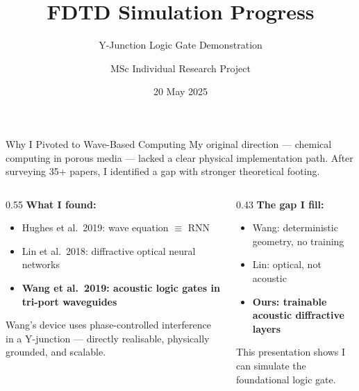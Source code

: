 \documentclass[aspectratio=169,11pt]{beamer}
\title{FDTD Simulation Progress}
\subtitle{Y-Junction Logic Gate Demonstration}
\author{MSc Individual Research Project}
\institute{Cranfield University\hspace{0.3cm}|\hspace{0.3cm}Supervisors: Prof. Weisi Guo, Prof. Takis Tsoutsanis}
\date{20 May 2025}
\begin{document}
\begin{frame}[plain]
  \titlepage
\end{frame}

\begin{frame}{Why I Pivoted to Wave-Based Computing}
  My original direction --- chemical computing in porous media --- lacked a clear physical implementation path. After surveying 35+ papers, I identified a gap with stronger theoretical footing.

  \vspace{0.2cm}
  \begin{columns}[T]
    \begin{column}{0.55\textwidth}
      \footnotesize
      \textbf{What I found:}
      \begin{itemize}
        \item Hughes et al.\ 2019: wave equation $\equiv$ RNN
        \item Lin et al.\ 2018: diffractive optical neural networks
        \item \textbf{Wang et al.\ 2019: acoustic logic gates in tri-port waveguides}
      \end{itemize}
      \vspace{0.1cm}
      Wang's device uses phase-controlled interference in a Y-junction --- directly realisable, physically grounded, and scalable.
    \end{column}
    \begin{column}{0.43\textwidth}
      \footnotesize
      \textbf{The gap I fill:}
      \begin{itemize}
        \item Wang: deterministic geometry, no training
        \item Lin: optical, not acoustic
        \item \textbf{Ours: trainable acoustic diffractive layers}
      \end{itemize}
      \vspace{0.1cm}
      This presentation shows I can simulate the foundational logic gate.
    \end{column}
  \end{columns}
\end{frame}
\end{document}
